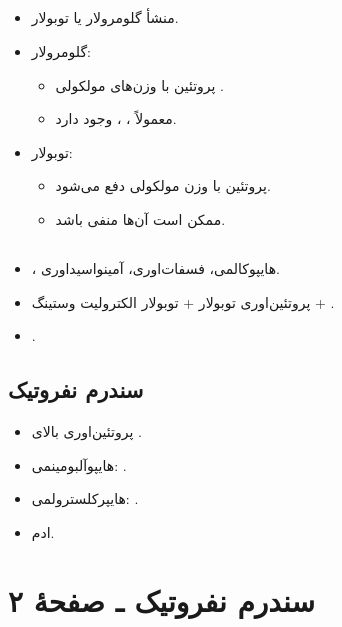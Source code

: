\documentclass[11pt,a4paper]{article}
\begin{document}
\subsection*{}
\begin{itemize}
\item منشأ گلومرولار یا توبولار.
\item گلومرولار:
  \begin{itemize}
  \item پروتئین با وزن‌های مولکولی .
  \item معمولاً ، ،  وجود دارد.
  \end{itemize}
\item توبولار:
  \begin{itemize}
  \item پروتئین با وزن مولکولی  دفع می‌شود.
  \item ممکن است  آن‌ها منفی باشد.
  \end{itemize}
\end{itemize}

\subsection*{}
\begin{itemize}
\item {}، هایپوکالمی، فسفات‌اوری، آمینواسیداوری.
\item پروتئین‌اوری توبولار + توبولار الکترولیت وستینگ + .
\item {}.
\end{itemize}

\subsection*{سندرم نفروتیک}
\begin{itemize}
\item پروتئین‌اوری بالای .
\item هایپوآلبومینمی: .
\item هایپرکلسترولمی: .
\item ادم.
\end{itemize}

\clearpage
\section*{سندرم نفروتیک ـ صفحهٔ ۲}
\end{document}

